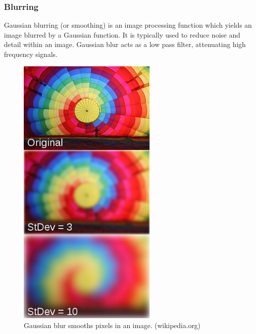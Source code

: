 \documentclass[11pt,a4paper]{report}
\begin{document}
			\subsubsection{Blurring}
				Gaussian blurring (or smoothing) is an image processing function which yields an image blurred by a Gaussian function. It is typically used to reduce noise and detail within an image. Gaussian blur acts as a low pass filter, attenuating high frequency signals.
				\begin{figure}[H]
					\centering
					\includegraphics[width=0.6\textwidth]{gaussian_blur}
					\caption[Gaussian blur]{Gaussian blur smooths pixels in an image. (wikipedia.org)}
					\label{fig:gaussian_blur}
				\end{figure}
			
\end{document}
